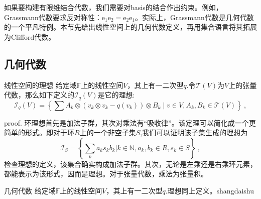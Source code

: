 
如果要构建有限维结合代数，我们需要对basis的结合作出约束。例如，Grassmann代数要求反对称性：$\mathrm {e_1e_2}=\mathrm {e_2e_1}$。实际上，Grassmann代数是几何代数的一个平凡特例。本节先给出线性空间上的几何代数定义，再用集合语言将其拓展为Clifford代数。
\subsection{几何代数}
\begin{theorem}{线性空间的理想}
给定域$\mathbb F$上的线性空间$V$，其上有一二次型$q$.令$\mathcal T(V)$为$V$上的张量代数，那么如下定义的$\mathcal {I}_q(V)$是它的理想:
\begin{equation}
\mathcal{I}_{q}(V)=\left\{\sum A_{k} \otimes(v_k \otimes v_k-q(v_k)) \otimes B_{k} \mid v \in V, A_{k}, B_{k} \in \mathcal{T}(V)\right\}~,
\end{equation}
\end{theorem}
proof.
环理想首先是加法子群，其次对乘法有“吸收律”。该定理可以简化成一个更简单的形式。即对于环$R$上的一个非空子集$S$,我们可以证明该子集生成的理想为
\begin{equation}
\mathcal {I}_S=\left\{\sum _k a_k s_kb_k|k\in \mathbb N ,a_k,b_k\in R,s_k\in S\right\}~,
\end{equation}
检查理想的定义，该集合确实构成加法子群。其次，无论是左乘还是右乘环元素，都能表示为该形式，因而是理想。对于张量代数，乘法为张量积。

\begin{definition}{几何代数}
给定域$\mathbb F$上的线性空间$V$，其上有一二次型$q$.理想同上定义。shangdaishu
\end{definition}


